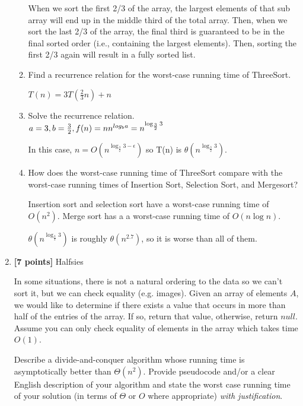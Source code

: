 \documentclass[11pt]{article}
\begin{document}
\begin{enumerate}
\begin{enumerate}
When we sort the first 2/3 of the array, the largest elements of that sub array will end up in the middle third of the total array. Then, when we sort the last 2/3 of the array, the final third is guaranteed to be in the final sorted order (i.e., containing the largest elements). Then, sorting the first 2/3 again will result in a fully sorted list.

\item Find a recurrence relation for the worst-case running time of ThreeSort.

$T(n) = 3T(\frac{2}{3}n) + n$

\item Solve the recurrence relation. \\
$
        a = 3, b = \frac{3}{2}, f(n) = n \\ \\
        n^{log_b a} = n^{\log_\frac{3}{2} 3} \\
$

    In this case, $n = O(n^{\log_\frac{3}{2} 3 - \epsilon})$ so T(n) is $\theta(n^{\log_\frac{3}{2} 3})$.  

\item How does the worst-case running time of ThreeSort compare with the worst-case running times of Insertion Sort, Selection Sort, and Mergesort?

Insertion sort and selection sort have a worst-case running time of $O(n^2)$. Merge sort has a a worst-case running time of $O(n \log n)$.

$\theta(n^{\log_\frac{3}{2} 3})$ is roughly $\theta(n^{2.7})$, so it is worse than all of them.

\end{enumerate}

\pagebreak
\item \textbf{[7 points]} Halfsies 

In some situations, there is not a natural ordering to the data so we can't sort it, but we can check equality (e.g. images).  Given an array of elements $A$, we would like to determine if there exists a value that occurs in more than half of the entries of the array.  If so, return that value, otherwise, return $null$.  Assume you can only check equality of elements in the array which takes time $O(1)$.

Describe a divide-and-conquer algorithm whose running time is
  asymptotically better than $\Theta(n^{2})$.  Provide pseudocode
  and/or a clear English description of your algorithm and state the worst case running time of your solution (in terms of $\Theta$ or $O$ where appropriate) \emph{with justification}.


\end{enumerate}
\end{document}

